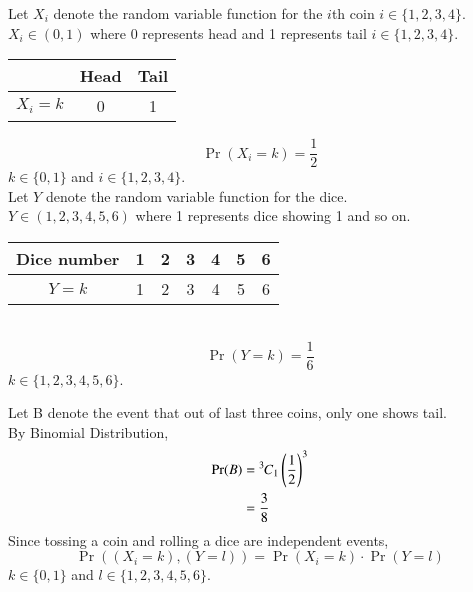 Let $X_i$ denote the random variable function for the $i$th coin $i\in\{1,2,3,4\}$.\\
$X_i\in(0,1)$ where 0 represents head and 1 represents tail $i\in\{1,2,3,4\}$.
\\[5pt]
\begin{tabular}{|c|c|c|}
\hline
     &Head&Tail  \\
     \hline
     $X_i=k$&0&1\\
     \hline
\end{tabular}
\begin{equation}\label{ec29-1:coin}
\Pr(X_i=k)=\dfrac{1}{2} 
\end{equation}
$k\in\{0,1\}$ and $i\in\{1,2,3,4\}$.
\\
Let $Y$ denote the random variable function for the dice.\\
$Y\in(1,2,3,4,5,6)$ where 1 represents dice showing 1 and so on.
\\[5pt]
\begin{tabular}{|c|c|c|c|c|c|c|}
\hline
     Dice number&1&2&3&4&5&6  \\
     \hline
     $Y=k$&1&2&3&4&5&6\\
     \hline
\end{tabular}
\\
\begin{equation}\label{ec29-1:dice}
\Pr(Y=k)=\dfrac{1}{6} 
\end{equation}
$k\in\{1,2,3,4,5,6\}$.
\\[20pt]
Let B denote the event that out of last three coins, only one shows tail. \\
By Binomial Distribution,
\begin{align}
\Pr(B)&={{}^{3}\mkern-1muC_{1}}\left({\dfrac{1}{2}}\right)^3
\\[\parskip]
&=\dfrac{3}{8}
\end{align}
%
Since tossing a coin and rolling a dice are independent events,
\begin{equation}\label{ec29-1:independent theorem}
\Pr( (X_i=k),(Y=l) )= \Pr(X_i=k)\cdot \Pr(Y=l)
\end{equation}
$k\in\{0,1\}$ and $l\in\{1,2,3,4,5,6\}$.

